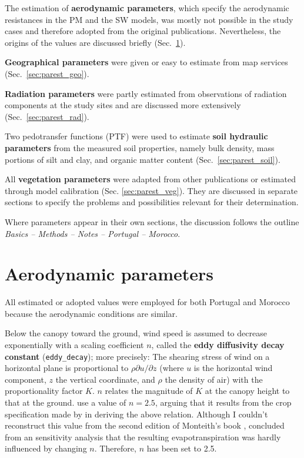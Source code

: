\documentclass{scrreprt}
\begin{document}
The estimation of \textbf{aerodynamic parameters}, which specify the aerodynamic resistances in the PM and the SW models, was mostly not possible in the study cases and therefore adopted from the original publications.
Nevertheless, the origins of the values are discussed briefly (Sec.~\ref{sec:parest_aero}).

\textbf{Geographical parameters} were given or easy to estimate from map services (Sec.~\ref{sec:parest_geo}).

\textbf{Radiation parameters} were partly estimated from observations of radiation components at the study sites and are discussed more extensively (Sec.~\ref{sec:parest_rad}).

Two pedotransfer functions (PTF) were used to estimate \textbf{soil hydraulic parameters} from the measured soil properties, namely bulk density, mass portions of silt and clay, and organic matter content (Sec.~\ref{sec:parest_soil}).

All \textbf{vegetation parameters} were adapted from other publications or estimated through model calibration (Sec. \ref{sec:parest_veg}).
They are discussed in separate sections to specify the problems and possibilities relevant for their determination.

Where parameters appear in their own sections, the discussion follows the outline \emph{Basics -- Methods -- Notes -- Portugal -- Morocco}.

\newpage
\section{Aerodynamic parameters} \label{sec:parest_aero}

All estimated or adopted values were employed for both Portugal and Morocco because the aerodynamic conditions are similar.

Below the canopy toward the ground, wind speed is assumed to decrease exponentially with a scaling coefficient $n$, called the \textbf{eddy diffusivity decay constant} (\verb!eddy_decay!); more precisely:
The shearing stress of wind on a horizontal plane is proportional to $\rho \partial u / \partial z$ (where $u$ is the horizontal wind component, $z$ the vertical coordinate, and $\rho$ the density of air) with the proportionality factor $K$.
$n$ relates the magnitude of $K$ at the canopy height to that at the ground.
\citet{shuttleworth85} use a value of $n = 2.5$, arguing that it results from the crop specification made by \citet{monteith73} in deriving the above relation.
Although I couldn't reconstruct this value from the second edition of Monteith's book \citep{monteith90}, \citet{shuttleworth85} concluded from an sensitivity analysis that the resulting evapotranspiration was hardly influenced by changing $n$.
Therefore, $n$ has been set to 2.5.
\end{document}
